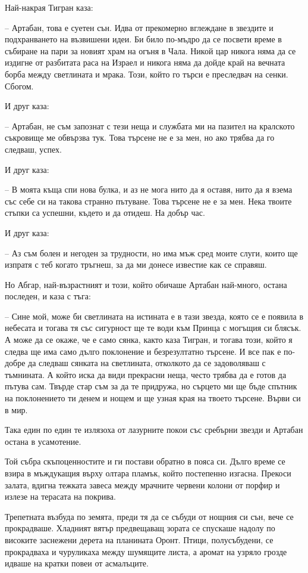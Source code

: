 Най-накрая Тигран каза:

-- Артабан, това е суетен сън. Идва от прекомерно вглеждане в звездите и
подхранването на възвишени идеи. Би било по-мъдро да се посвети време в събиране
на пари за новият храм на огъня в Чала. Никой цар никога няма да се издигне от
разбитата раса на Израел и никога няма да дойде край на вечната борба между
светлината и мрака. Този, който го търси е преследвач на сенки. Сбогом.

И друг каза:

-- Артабан, не съм запознат с тези неща и службата ми на пазител на кралското
съкровище ме обвързва тук. Това търсене не е за мен, но ако трябва да го
следваш, успех.

И друг каза:

-- В моята къща спи нова булка, и аз не мога нито да я оставя, нито да я взема
със себе си на такова странно пътуване. Това търсене не е за мен. Нека твоите
стъпки са успешни, където и да отидеш. На добър час.

И друг каза:

-- Аз съм болен и негоден за трудности, но има мъж сред моите слуги, които ще
изпратя с теб когато тръгнеш, за да ми донесе известие как се справяш.

Но Абгар, най-възрастният и този, който обичаше Артабан най-много, остана
последен, и каза с тъга:

-- Сине мой, може би светлината на истината е в тази звезда, която се е появила
в небесата и тогава тя със сигурност ще те води към Принца с могъщия си блясък.
А може да се окаже, че е само сянка, както каза Тигран, и тогава този, който я
следва ще има само дълго поклонение и безрезултатно търсене. И все пак е
по-добре да следваш сянката на светлината, отколкото да се задоволяваш с
тъмнината. А който иска да види прекрасни неща, често трябва да е готов да
пътува сам. Твърде стар съм за да те придружа, но сърцето ми ще бъде спътник на
поклонението ти денем и нощем и ще узная края на твоето търсене. Върви си в мир.

Така един по един те излязоха от лазурните покои със сребърни звезди и Артабан
остана в усамотение.

Той събра скъпоценностите и ги постави обратно в пояса си. Дълго време се взира
в мъждукащия върху олтара пламък, който постепенно изгасна. Прекоси залата,
вдигна тежката завеса между мрачните червени колони от порфир и излезе на
терасата на покрива.

Трепетната възбуда по земята, преди тя да се събуди от нощния си сън, вече се
прокрадваше. Хладният вятър предвещаващ зората се спускаше надолу по високите
заснежени дерета на планината Оронт. Птици, полусъбудени, се прокрадваха и
чуруликаха между шумящите листа, а аромат на узряло грозде идваше на кратки
повеи от асмалъците.

